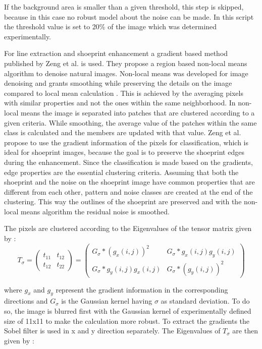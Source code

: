 \documentclass[draft,final]{vutinfth} %
\begin{document}
If the background area is smaller than a given threshold, this step is skipped, because in this case no robust model about the noise can be made.
In this script the threshold value is set to 20\% of the image which was determined experimentally.
\par
For line extraction and shoeprint enhancement a gradient based method published by Zeng et al. \cite{zeng2011region} is used.
They propose a region based non-local means algorithm to denoise natural images.
Non-local means was developed for image denoising and grants smoothing while preserving the details on the image compared to local mean calculation \cite{buades2005non}.
This is achieved by the averaging pixels with similar properties and not the ones within the same neighborhood.
In non-local means the image is separated into patches that are clustered according to a given criteria.
While smoothing, the average value of the patches within the same class is calculated and the members are updated with that value.
Zeng et al. \cite{zeng2011region} propose to use the gradient information of the pixels for classification, which is ideal for shoeprint images, because the goal is to preserve the shoeprint edges during the enhancement.
Since the classification is made based on the gradients, edge properties are the essential clustering criteria.
Assuming that both the shoeprint and the noise on the shoeprint image have common properties that are different from each other, pattern and noise classes are created at the end of the clustering.
This way the outlines of the shoeprint are preserved and with the non-local means algorithm the residual noise is smoothed.
\par 
The pixels are clustered according to the Eigenvalues of the tensor matrix given by \cite{zeng2011region}:
\begin{equation}
T_\sigma = 
\begin{pmatrix}
t_{11} & t_{12} \\
t_{12} & t_{22}
\end{pmatrix}
=
\begin{pmatrix}
G_\sigma*(g_x(i,j))^2 & G_{\sigma}*g_x(i, j)g_y(i, j)\\
G_{\sigma}*g_y(i, j)g_x(i, j) & G_{\sigma}*(g_y(i, j))^2
\end{pmatrix}
\end{equation}

where $g_x$ and $g_y$ represent the gradient information in the corresponding directions and $G_\sigma$ is the Gaussian kernel having $\sigma$ as standard deviation.
To do so, the image is blurred first with the Gaussian kernel of experimentally defined size of 11x11 to make the calculation more robust.
To extract the gradients the Sobel filter is used in x and y direction separately.
The Eigenvalues of $T_\sigma$ are then given by \cite{zeng2011region}:
\end{document}
